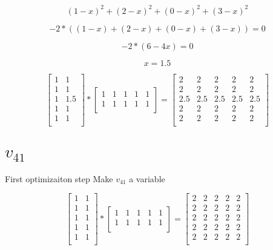 \documentclass{report}
\begin{document}
\begin{equation}
(1-x)^{2}+(2-x)^{2}+(0-x)^{2}+(3-x)^{2}
\end{equation}

\begin{equation}
-2 * ((1-x)+(2-x)+(0-x)+(3-x)) = 0
\end{equation}

\begin{equation}
-2 * (6-4x) = 0
\end{equation}

\begin{equation}
x = 1.5
\end{equation}

\[
  \begin{bmatrix}
    1 & 1 \\
    1 & 1 \\
    1 & 1.5 \\
    1 & 1 \\
    1 & 1 \\
  \end{bmatrix}
  * 
  \begin{bmatrix}
    1 & 1 & 1 & 1 & 1 \\
    1 & 1 & 1 & 1 & 1 \\
  \end{bmatrix}
  =
  \begin{bmatrix}
    2   & 2   & 2   & 2   & 2   \\
    2   & 2   & 2   & 2   & 2   \\
    2.5 & 2.5 & 2.5 & 2.5 & 2.5 \\
    2   & 2   & 2   & 2   & 2   \\
    2   & 2   & 2   & 2   & 2   \\
  \end{bmatrix}
\]

\section{$v_{41}$}

First optimizaiton step
Make $v_{41}$ a variable

\[
  \begin{bmatrix}
    1 & 1 \\
    1 & 1 \\
    1 & 1 \\
    1 & 1 \\
    1 & 1 \\
  \end{bmatrix}
  * 
  \begin{bmatrix}
    1 & 1 & 1 & 1 & 1 \\
    1 & 1 & 1 & 1 & 1 \\
  \end{bmatrix}
  =
  \begin{bmatrix}
    2 & 2 & 2 & 2 & 2 \\
    2 & 2 & 2 & 2 & 2 \\
    2 & 2 & 2 & 2 & 2 \\
    2 & 2 & 2 & 2 & 2 \\
    2 & 2 & 2 & 2 & 2 \\
  \end{bmatrix}
\]
\end{document}
